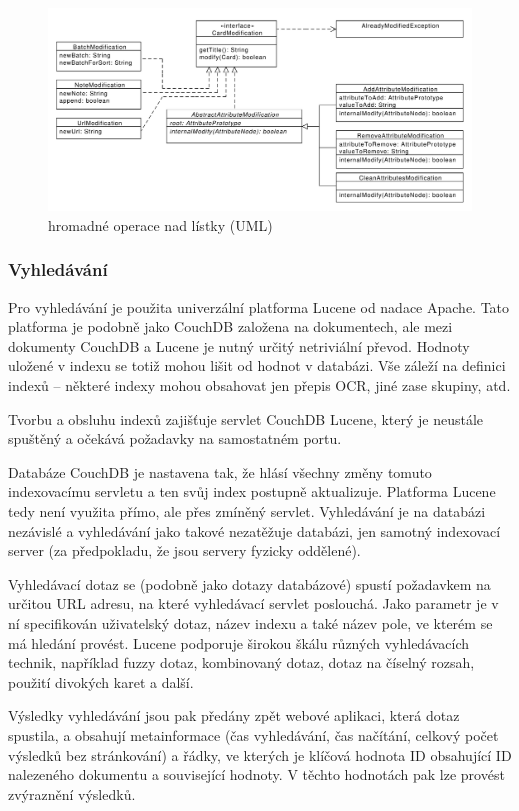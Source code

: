 \begin{figure}
\label{fig:uml_modify}
\centering
\includegraphics[width=\textwidth]{uml_modify.pdf}
\caption{hromadné operace nad lístky (UML)}
\end{figure}

\subsubsection{Vyhledávání}

Pro vyhledávání je použita univerzální platforma Lucene od nadace Apache. Tato platforma je podobně jako CouchDB založena na dokumentech, ale mezi dokumenty CouchDB a Lucene je nutný určitý netriviální převod. Hodnoty uložené v indexu se totiž mohou lišit od hodnot v databázi. Vše záleží na definici indexů -- některé indexy mohou obsahovat jen přepis OCR, jiné zase skupiny, atd. 

Tvorbu a obsluhu indexů zajišťuje servlet CouchDB Lucene, který je neustále spuštěný a očekává požadavky na samostatném portu. 

Databáze CouchDB je nastavena tak, že hlásí všechny změny tomuto indexovacímu servletu a ten svůj index postupně aktualizuje. Platforma Lucene tedy není využita přímo, ale přes zmíněný servlet. Vyhledávání je na databázi nezávislé a vyhledávání jako takové nezatěžuje databázi, jen samotný indexovací server (za předpokladu, že jsou servery fyzicky oddělené).

Vyhledávací dotaz se (podobně jako dotazy databázové) spustí požadavkem na určitou URL adresu, na které vyhledávací servlet poslouchá. Jako parametr je v ní specifikován uživatelský dotaz, název indexu a také název pole, ve kterém se má hledání provést. Lucene podporuje širokou škálu různých vyhledávacích technik, například fuzzy dotaz, kombinovaný dotaz, dotaz na číselný rozsah, použití divokých karet a další.

Výsledky vyhledávání jsou pak předány zpět webové aplikaci, která dotaz spustila, a obsahují metainformace (čas vyhledávání, čas načítání, celkový počet výsledků bez stránkování) a řádky, ve kterých je klíčová hodnota ID obsahující ID nalezeného dokumentu a související hodnoty. V těchto hodnotách pak lze provést zvýraznění výsledků.

